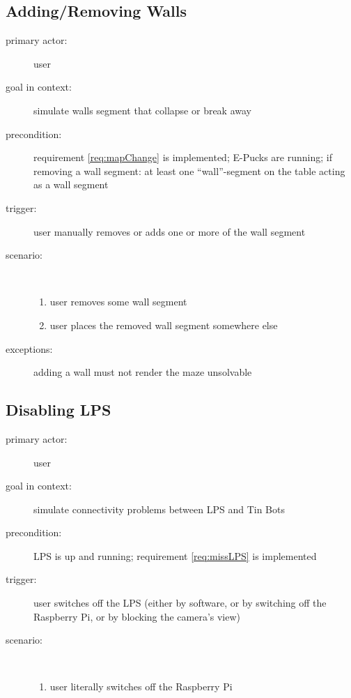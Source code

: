 \documentclass[a4paper,parskip,headheight=38pt]{scrartcl} %
\begin{document}
\subsection{Adding/Removing Walls}
\begin{description}
\item[primary actor:] user
\item[goal in context:] simulate walls segment that collapse or break away
\item[precondition:] requirement \ref{req:mapChange} is implemented; E-Pucks are running; if removing a wall segment: at least one \enquote{wall}-segment on the table acting as a wall segment
\item[trigger:] user manually removes or adds one or more of the wall segment
\item[scenario:] \
\begin{enumerate}
	\item user removes some wall segment
	\item user places the removed wall segment somewhere else
\end{enumerate}
\item[exceptions:] adding a wall must not render the maze unsolvable
\end{description}

\subsection{Disabling LPS}
\begin{description}
\item[primary actor:] user
\item[goal in context:] simulate connectivity problems between LPS and Tin Bots
\item[precondition:] LPS is up and running; requirement \ref{req:missLPS} is implemented
\item[trigger:] user switches off the LPS (either by software, or by switching off the Raspberry Pi, or by blocking the camera's view)
\item[scenario:] \
\begin{enumerate}
	\item user literally switches off the Raspberry Pi
\end{enumerate}
\end{description}
\end{document}
